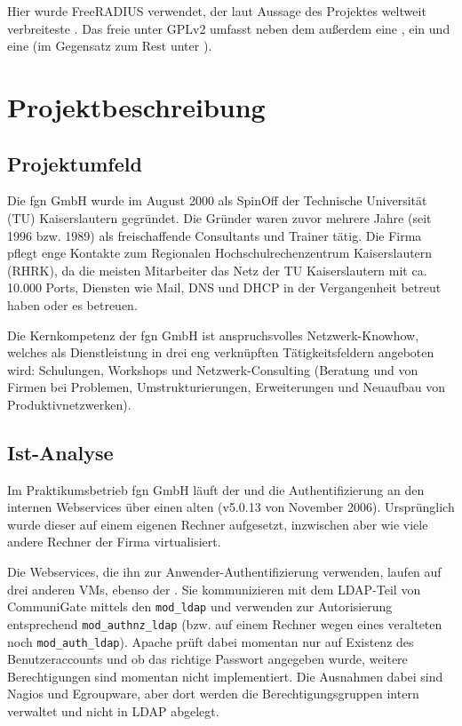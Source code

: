 \documentclass[11pt,a4paper,titlepage=firstiscover]{scrartcl} %
\begin{document}
Hier wurde FreeRADIUS verwendet, der \tcr{-} laut Aussage des Projektes \tcr{-} 
weltweit verbreiteste . Das freie  
unter GPLv2 umfasst neben dem  außerdem eine 
, ein  und eine 
 (im Gegensatz zum Rest unter ).


\section{Projektbeschreibung}
\subsection{Projektumfeld}
Die fgn GmbH wurde im August 2000 als SpinOff der Technische Universität (TU) 
Kaiserslautern gegründet. Die Gründer waren zuvor mehrere Jahre (seit 1996 bzw. 
1989) als freischaffende Consultants und Trainer tätig. Die Firma pflegt enge 
Kontakte zum Regionalen Hochschulrechenzentrum Kaiserslautern (RHRK), da die 
meisten Mitarbeiter das Netz der TU Kaiserslautern mit ca. 10.000 Ports, 
Diensten wie Mail, DNS und DHCP in der Vergangenheit betreut haben oder es 
 betreuen.

Die Kernkompetenz der fgn GmbH ist anspruchsvolles Netzwerk-Knowhow, welches 
als Dienstleistung in drei eng verknüpften Tätigkeitsfeldern angeboten wird: 
Schulungen, Workshops und Netzwerk-Consulting (Beratung und  von Firmen bei Problemen, Umstrukturierungen, 
Erweiterungen und Neuaufbau von Produktivnetzwerken).

\subsection{Ist-Analyse}
Im Praktikumsbetrieb fgn GmbH läuft der  und die 
Authentifizierung an den internen Webservices   
über einen alten  (v5.0.13 von November 2006). 
Ursprünglich wurde dieser auf einem eigenen Rechner aufgesetzt, inzwischen aber 
\tcr{-} wie viele andere Rechner der Firma \tcr{-} virtualisiert. 

Die Webservices, die ihn zur Anwender-Authentifizierung verwenden, laufen auf 
drei anderen VMs, ebenso der . Sie kommunizieren mit dem 
LDAP-Teil von CommuniGate mittels den  \texttt{mod\_ldap} und 
verwenden zur Autorisierung entsprechend \texttt{mod\_authnz\_ldap} (bzw. auf 
einem  Rechner wegen eines veralteten  noch 
\texttt{mod\_auth\_ldap}). Apache prüft dabei momentan nur auf Existenz des 
 Benutzeraccounts und ob das richtige Passwort 
angegeben wurde, weitere Berechtigungen sind momentan nicht implementiert. Die 
Ausnahmen dabei sind Nagios und Egroupware, aber dort werden die 
Berechtigungsgruppen intern verwaltet und nicht in LDAP abgelegt.
\end{document}
